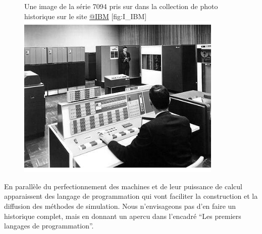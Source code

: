\begin{figure}[h]
\begin{sidecaption}[fortoc]{Une image de la série 7094 pris sur dans la collection de photo historique sur le site \href{http://www-03.ibm.com/ibm/history/exhibits/mainframe/mainframe_album.html}{@IBM} }[fig:I_IBM]
  \centering
 \includegraphics[width=.8\linewidth]{IBM7094.jpg}
  \end{sidecaption}
\end{figure}

En parallèle du perfectionnement des machines et de leur puissance de calcul apparaissent des langage de programmation qui vont faciliter la construction et la diffusion des méthodes de simulation. Nous n'envisageons pas d'en faire un historique complet, mais en donnant un apercu dans l'encadré \enquote{Les premiers langages de programmation}.

